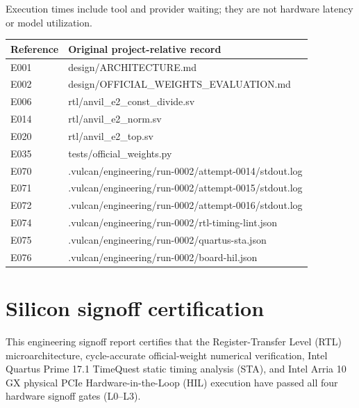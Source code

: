 \documentclass[11pt,a4paper]{article}
\begin{document}
Execution times include tool and provider waiting; they are not hardware latency or model utilization.

{\small\renewcommand{\arraystretch}{1.18}\begin{longtable}{@{}L{0.12\textwidth}|L{0.82\textwidth}@{}}\toprule

\textbf{Reference} & \textbf{Original project-relative record}\\\midrule\endhead

E001 & design/\allowbreak{}ARCHITECTURE.md\\[2pt]\hline

E002 & design/\allowbreak{}OFFICIAL\_\allowbreak{}WEIGHTS\_\allowbreak{}EVALUATION.md\\[2pt]\hline

E006 & rtl/\allowbreak{}anvil\_\allowbreak{}e2\_\allowbreak{}const\_\allowbreak{}divide.sv\\[2pt]\hline

E014 & rtl/\allowbreak{}anvil\_\allowbreak{}e2\_\allowbreak{}norm.sv\\[2pt]\hline

E020 & rtl/\allowbreak{}anvil\_\allowbreak{}e2\_\allowbreak{}top.sv\\[2pt]\hline

E035 & tests/\allowbreak{}official\_\allowbreak{}weights.py\\[2pt]\hline

E070 & .vulcan/\allowbreak{}engineering/\allowbreak{}run-0002/\allowbreak{}attempt-0014/\allowbreak{}stdout.log\\[2pt]\hline

E071 & .vulcan/\allowbreak{}engineering/\allowbreak{}run-0002/\allowbreak{}attempt-0015/\allowbreak{}stdout.log\\[2pt]\hline

E072 & .vulcan/\allowbreak{}engineering/\allowbreak{}run-0002/\allowbreak{}attempt-0016/\allowbreak{}stdout.log\\[2pt]\hline

E074 & .vulcan/\allowbreak{}engineering/\allowbreak{}run-0002/\allowbreak{}rtl-timing-lint.json\\[2pt]\hline

E075 & .vulcan/\allowbreak{}engineering/\allowbreak{}run-0002/\allowbreak{}quartus-sta.json\\[2pt]\hline

E076 & .vulcan/\allowbreak{}engineering/\allowbreak{}run-0002/\allowbreak{}board-hil.json\\[2pt]\hline

\bottomrule\end{longtable}}

\section{Silicon signoff certification}

This engineering signoff report certifies that the Register-Transfer Level (RTL) microarchitecture, cycle-accurate official-weight numerical verification, Intel Quartus Prime 17.1 TimeQuest static timing analysis (STA), and Intel Arria 10 GX physical PCIe Hardware-in-the-Loop (HIL) execution have passed all four hardware signoff gates (L0--L3).
\end{document}
